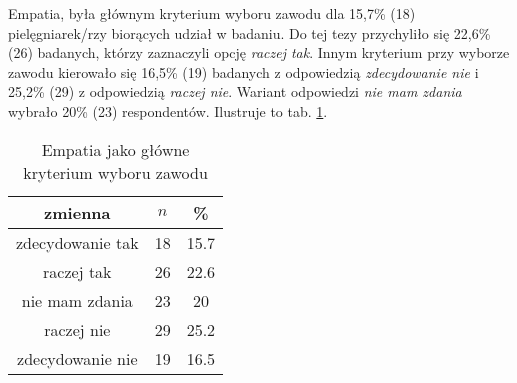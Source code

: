 



Empatia, była głównym kryterium wyboru zawodu dla 15,7\% (18) pielęgniarek/rzy biorących udział w badaniu. Do tej tezy przychyliło się 22,6\% (26) badanych, którzy zaznaczyli opcję \textit{raczej tak}. Innym kryterium przy wyborze zawodu kierowało się 16,5\% (19) badanych z odpowiedzią \textit{zdecydowanie nie} i 25,2\% (29) z odpowiedzią \textit{raczej nie}. Wariant odpowiedzi \textit{nie mam zdania} wybrało 20\% (23) respondentów. Ilustruje to tab. \ref{tab:Q34}.






\begin{table}[H]
\caption{Empatia jako główne kryterium wyboru zawodu}
\centering
\begin{tabular}{ | c | c | c |}
\hline
zmienna & $n$ & \% \\
\hline
zdecydowanie tak  &  18  & 15.7 \\
\hline
raczej tak  &  26  & 22.6 \\
\hline
nie mam zdania  &  23  & 20 \\
\hline
raczej nie  &  29  & 25.2 \\
\hline
zdecydowanie nie  &  19  & 16.5 \\
\hline
\end{tabular}
\label{tab:Q34}
\end{table}
